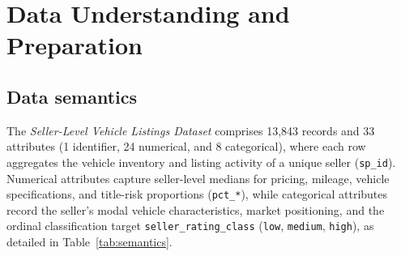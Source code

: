 
\section{Data Understanding and Preparation}
\label{sec:understanding}

\subsection{Data semantics}
\label{sec:semantics}
The \emph{Seller-Level Vehicle Listings Dataset} comprises 13,843 records and 33 attributes (1 identifier, 24 numerical, and 8 categorical), where each row aggregates the vehicle inventory and listing activity of a unique seller (\texttt{sp\_id}). Numerical attributes capture seller-level medians for pricing, mileage, vehicle specifications, and title-risk proportions (\texttt{pct\_*}), while categorical attributes record the seller's modal vehicle characteristics, market positioning, and the ordinal classification target \texttt{seller\_rating\_class} (\texttt{low}, \texttt{medium}, \texttt{high}), as detailed in Table~\ref{tab:semantics}.

